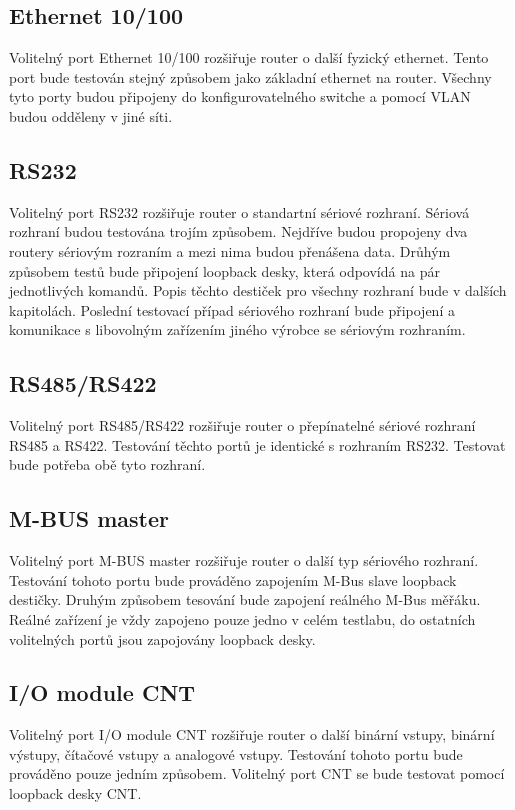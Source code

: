 \subsection{Ethernet 10/100}
Volitelný port Ethernet 10/100 rozšiřuje router o další fyzický ethernet. Tento port bude testován stejný způsobem jako základní ethernet na router. Všechny tyto porty budou připojeny do konfigurovatelného switche a pomocí VLAN budou odděleny v jiné síti.

\subsection{RS232}
Volitelný port RS232 rozšiřuje router o standartní sériové rozhraní. Sériová rozhraní budou testována trojím způsobem. Nejdříve budou propojeny dva routery sériovým rozraním a mezi nima budou přenášena data. Drůhým způsobem testů bude připojení loopback desky, která odpovídá na pár jednotlivých komandů. Popis těchto destiček pro všechny rozhraní bude v dalších kapitolách. Poslední testovací případ sériového rozhraní bude připojení a komunikace s libovolným zařízením jiného výrobce se sériovým rozhraním.

\subsection{RS485/RS422}
Volitelný port RS485/RS422 rozšiřuje router o přepínatelné sériové rozhraní RS485 a RS422. Testování těchto portů je identické s rozhraním RS232. Testovat bude potřeba obě tyto rozhraní.

\subsection{M-BUS master}
Volitelný port M-BUS master rozšiřuje router o další typ sériového rozhraní. Testování tohoto portu bude prováděno zapojením M-Bus slave loopback destičky. Druhým způsobem tesování bude zapojení reálného M-Bus měřáku. Reálné zařízení je vždy zapojeno pouze jedno v celém testlabu, do ostatních volitelných portů jsou zapojovány loopback desky.

\subsection{I/O module CNT}
Volitelný port I/O module CNT rozšiřuje router o další binární vstupy, binární výstupy, čítačové vstupy a analogové vstupy. Testování tohoto portu bude prováděno pouze jedním způsobem. Volitelný port CNT se bude testovat pomocí loopback desky CNT.

